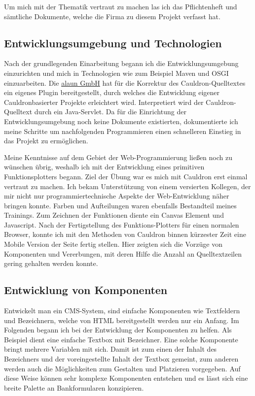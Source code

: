 \documentclass[12pt]{article}
\begin{document}
Um mich mit der Thematik vertraut zu machen las ich das Pflichtenheft und sämtliche Dokumente, welche die Firma
zu diesem Projekt verfasst hat. 

\subsection{Entwicklungsumgebung und Technologien}

Nach der grundlegenden Einarbeitung begann ich die Entwicklungsumgebung einzurichten und mich in Technologien
wie zum Beispiel Maven und OSGI einzuarbeiten. Die \href{https://alaun.de/home/}{alaun GmbH} hat für die Korrektur
des Cauldron-Quelltextes ein eigenes Plugin bereitgestellt, durch welches die Entwicklung eigener Cauldronbasierter
Projekte erleichtert wird. Interpretiert wird der Cauldron-Quelltext durch ein Java-Servlet. 
Da für die Einrichtung der Entwicklungsumgebung noch keine Dokumente existierten, dokumentierte ich meine Schritte
um nachfolgenden Programmieren einen schnelleren Einstieg in das Projekt zu ermöglichen.

Meine Kenntnisse auf dem Gebiet der Web-Programmierung ließen noch zu wünschen übrig, weshalb ich mit der Entwicklung
eines primitiven Funktionsplotters begann. Ziel der Übung war es mich mit Cauldron erst einmal vertraut zu machen.
Ich bekam Unterstützung von einem versierten Kollegen, der mir nicht nur programmiertechnische Aspekte der Web-Entwicklung näher bringen konnte.
Farben und Aufteilungen waren ebenfalls Bestandteil meines Trainings. 
Zum Zeichnen der Funktionen diente ein Canvas Element und Javascript.
Nach der Fertigstellung des Funktions-Plotters für einen normalen Browser, konnte ich mit den Methoden von Cauldron
binnen kürzester Zeit eine Mobile Version der Seite fertig stellen.
Hier zeigten sich die Vorzüge von Komponenten und Vererbungen, mit deren Hilfe die Anzahl an Quelltextzeilen gering gehalten
werden konnte.

\subsection{Entwicklung von Komponenten}

Entwickelt man ein CMS-System, sind einfache Komponenten wie Textfeldern und Bezeichnern, welche von HTML bereitgestellt werden
nur ein Anfang. Im Folgenden begann ich bei der Entwicklung der Komponenten zu helfen. Als Beispiel dient eine einfache Textbox
mit Bezeichner. Eine solche Komponente bringt mehrere Variablen mit sich. Damit ist zum einen der Inhalt des Bezeichners und der
voreingestellte Inhalt der Textbox gemeint, zum anderen werden auch die Möglichkeiten zum Gestalten und Platzieren vorgegeben.
Auf diese Weise können sehr komplexe Komponenten entstehen und es lässt sich eine breite Palette an Bankformularen konzipieren.
\end{document}

